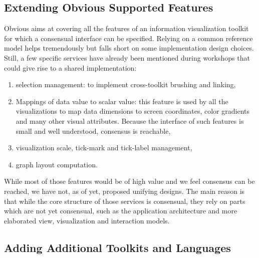 
\subsection{Extending Obvious Supported Features}

Obvious aims at covering all the features of an information
visualization toolkit for which a consensual interface can be
specified.  Relying on a common reference model helps tremendously but
falls short on some implementation design choices.  Still, a few
specific services have already been mentioned during workshops that
could give rise to a shared implementation:

\begin{enumerate}
\item selection management: to implement cross-toolkit brushing and
  linking,
\item Mappings of data value to scalar value: this feature is used by
  all the visualizations to map data dimensions to screen coordinates,
  color gradients and many other visual attributes. Because the
  interface of such features is small and well understood, consensus
  is reachable,
\item visualization scale, tick-mark and tick-label management,
\item graph layout computation.
\end{enumerate}

While most of those features would be of high value and we feel
consensus can be reached, we have not, as of yet, proposed unifying
designs.  The main reason is that while the core structure of those
services is consensual, they rely on parts which are not yet
consensual, such as the application architecture and more elaborated
view, visualization and interaction models.

\subsection{Adding Additional Toolkits and Languages}

\begin{comment}

A true test of how generalizable and unifying Obvious would be
post-hoc integration of a new toolkit. IBM ILOG JViews~\cite{JViews}
is one such example being considered. Because it is a commercial
product, this would have the advantage of bringing considerable
exposure to the platform.
\end{comment}

